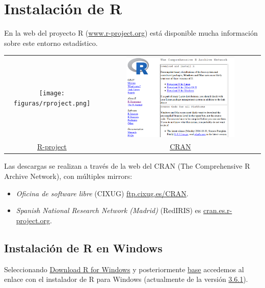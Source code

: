 \documentclass[
]{book}
\providecommand{\tightlist}{%
  \setlength{\itemsep}{0pt}\setlength{\parskip}{0pt}}
\theoremstyle{break}
\begin{document}
\hypertarget{instalacion}{%
\chapter{Instalación de R}\label{instalacion}}

En la web del proyecto R
(\href{http://www.r-project.org}{www.r-project.org}) está disponible
mucha información sobre este entorno estadístico.

\begin{longtable}[]{@{}cc@{}}
\toprule
\endhead
\texttt{[image: figuras/rproject.png]} & \includegraphics[width=0.7\textwidth,height=\textheight]{figuras/cran.png} \\
\href{https://r-project.org}{R-project} & \href{https://cran.r-project.org}{CRAN} \\
\bottomrule
\end{longtable}

Las descargas se realizan a través de la web del CRAN (The Comprehensive
R Archive Network), con múltiples mirrors:

\begin{itemize}
\tightlist
\item
  \emph{Oficina de software libre} (CIXUG) \href{http://ftp.cixug.es/CRAN/}{ftp.cixug.es/CRAN}.
\item
  \emph{Spanish National Research Network (Madrid)} (RedIRIS) es
  \href{http://cran.es.r-project.org/}{cran.es.r-project.org}.
\end{itemize}

\hypertarget{instalaciuxf3n-de-r-en-windows}{%
\section{Instalación de R en Windows}\label{instalaciuxf3n-de-r-en-windows}}

Seleccionando \href{http://ftp.cixug.es/CRAN/bin/windows/}{Download R for Windows} y posteriormente
\href{http://ftp.cixug.es/CRAN/bin/windows/base/}{base} accedemos
al enlace con el instalador de R para Windows (actualmente de la versión
\href{http://ftp.cixug.es/CRAN/bin/windows/base/R-3.6.1-win.exe}{3.6.1}).
\end{document}
